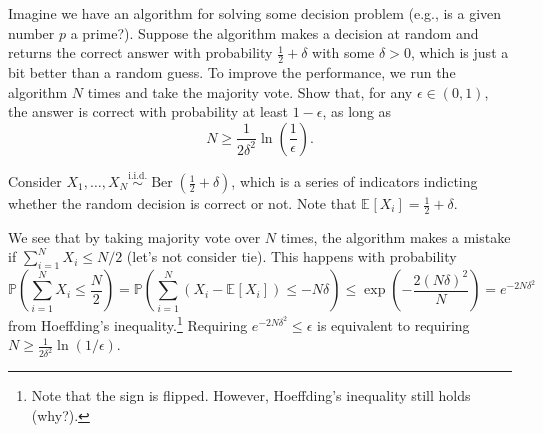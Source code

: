 \begin{problem*}[Exercise 2.2.8]\label{ex2.2.8}
	Imagine we have an algorithm for solving some decision problem (e.g., is a given number \(p\) a prime?). Suppose the algorithm makes a decision at random and returns the correct answer with probability \(\frac{1}{2} + \delta \) with some \(\delta > 0\), which is just a bit better than a random guess. To improve the performance, we run the algorithm \(N\) times and take the majority vote. Show that, for any \(\epsilon \in (0, 1)\), the answer is correct with probability at least \(1 - \epsilon \), as long as
	\[
		N
		\geq \frac{1}{2\delta ^2} \ln (\frac{1}{\epsilon }).
	\]
\end{problem*}
\begin{answer}
	Consider \(X_1, \dots , X_N \overset{\text{i.i.d.} }{\sim } \operatorname{Ber}(\frac{1}{2} + \delta ) \), which is a series of indicators indicting whether the random decision is correct or not. Note that \(\mathbb{E}_{}\left[X_i \right] = \frac{1}{2} + \delta \).

	We see that by taking majority vote over \(N\) times, the algorithm makes a mistake if \(\sum_{i=1}^{N} X_i \leq N / 2\) (let's not consider tie). This happens with probability
	\[
		\mathbb{P} \left( \sum_{i=1}^{N} X_i \leq \frac{N}{2} \right)
		= \mathbb{P} \left( \sum_{i=1}^{N} (X_i - \mathbb{E}_{}\left[X_i \right] ) \leq - N \delta  \right)
		\leq \exp (- \frac{2(N \delta )^2}{N})
		= e^{-2 N \delta ^2}
	\]
	from Hoeffding's inequality.\footnote{Note that the sign is flipped. However, Hoeffding's inequality still holds (why?).} Requiring \(e^{-2 N \delta ^2} \leq \epsilon \) is equivalent to requiring \(N \geq \frac{1}{2 \delta ^2} \ln (1 / \epsilon )\).
\end{answer}

